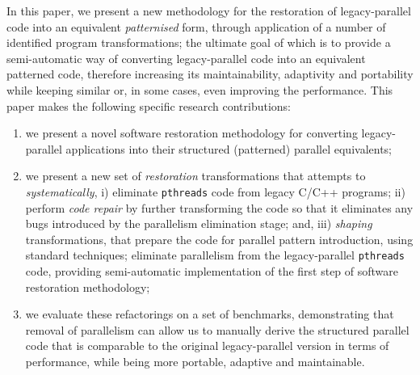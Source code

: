 In this paper, we present a new methodology for the restoration of legacy-parallel code into an equivalent \emph{patternised} form, through application of a number of identified program transformations; the ultimate goal of which is to provide a semi-automatic way of converting legacy-parallel code into an equivalent patterned code, therefore increasing its maintainability, adaptivity and portability while keeping similar or, in some cases, even improving the performance. 
%
This paper makes the following specific research contributions:
\begin{enumerate}
    \item we present a novel software restoration methodology for converting legacy-parallel applications into their structured (patterned) parallel equivalents;
    \item we present a new set of \emph{restoration} transformations that attempts to \emph{systematically}, i) eliminate \lstinline{pthreads} code from legacy C/C++ programs; ii) perform \emph{code repair} by further transforming the code so that it eliminates any bugs introduced by the parallelism elimination stage; and, iii) \emph{shaping} transformations, that prepare the code for parallel pattern introduction, using standard techniques;
    eliminate parallelism from the legacy-parallel \lstinline{pthreads} code, providing semi-automatic implementation of the first step of software restoration methodology;
    \item we evaluate these refactorings on a set of benchmarks, demonstrating that removal of parallelism can allow us to manually derive the structured parallel code that is comparable to the original legacy-parallel version in terms of performance, while being more portable, adaptive and maintainable.
\end{enumerate}

